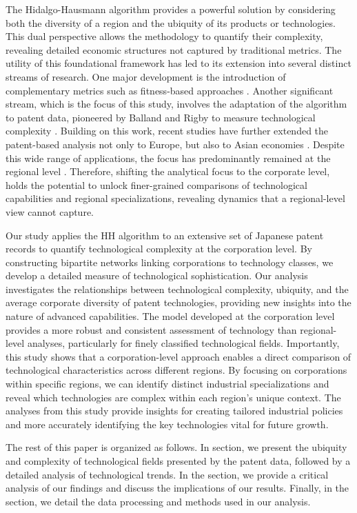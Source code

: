 The Hidalgo-Hausmann algorithm\cite{hidalgo2009eci} provides a powerful solution by considering both the diversity of a region and the ubiquity of its products or technologies. 
This dual perspective allows the methodology to quantify their complexity, revealing detailed economic structures not captured by traditional metrics. 
The utility of this foundational framework has led to its extension into several distinct streams of research\cite{Hidalgo2021,Hidalgo2023,Hausmann2024,Balland2022,Chakraborty2020}. 
One major development is the introduction of complementary metrics such as fitness-based approaches \cite{Tacchella2012,Wu2016,Albeaik2017}. 
Another significant stream, which is the focus of this study, involves the adaptation of the algorithm to patent data, pioneered by Balland and Rigby to measure technological complexity \cite{balland2017tci}. 
Building on this work, recent studies have further extended the patent-based analysis not only to Europe\cite{Pinheiro2022,ballandandboschma2021}, but also to Asian economies \cite{Jun2023,Abay2024}.
Despite this wide range of applications, the focus has predominantly remained at the regional level \cite{Hidalgo2021}. 
Therefore, shifting the analytical focus to the corporate level, holds the potential to unlock finer-grained comparisons of technological capabilities and regional specializations, revealing dynamics that a regional-level view cannot capture.


Our study applies the HH algorithm to an extensive set of Japanese patent records to quantify technological complexity at the corporation level. 
By constructing bipartite networks linking corporations to technology classes, we develop a detailed measure of technological sophistication. 
Our analysis investigates the relationships between technological complexity, ubiquity, and the average corporate diversity of patent technologies, providing new insights into the nature of advanced capabilities. 
The model developed at the corporation level provides a more robust and consistent assessment of technology than regional-level analyses, particularly for finely classified technological fields. 
Importantly, this study shows that a corporation-level approach enables a direct comparison of technological characteristics across different regions. 
By focusing on corporations within specific regions, we can identify distinct industrial specializations and reveal which technologies are complex within each region’s unique context. The analyses from this study provide insights for creating tailored industrial policies and more accurately identifying the key technologies vital for future growth.

The rest of this paper is organized as follows. 
In  section, we present the ubiquity and complexity of technological fields presented by the patent data, followed by a detailed analysis of technological trends.
In the  section, we provide a critical analysis of our findings and discuss the implications of our results.
Finally, in the  section, we detail the data processing and methods used in our analysis.